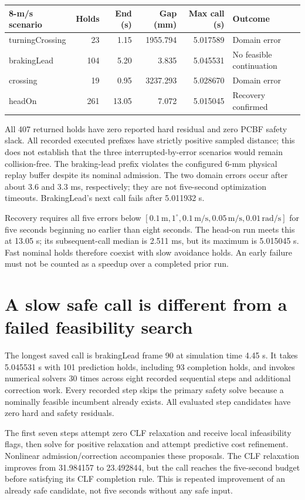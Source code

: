\documentclass[11pt]{article}
\begin{document}
\begin{center}\small
\begin{tabular}{lrrrrl}
\toprule
8-m/s scenario & Holds & End (s) & Gap (mm) & Max call (s) & Outcome \\
\midrule
turningCrossing & 23 & 1.15 & 1955.794 & 5.017589 & Domain error \\
brakingLead & 104 & 5.20 & 3.835 & 5.045531 & No feasible continuation \\
crossing & 19 & 0.95 & 3237.293 & 5.028670 & Domain error \\
headOn & 261 & 13.05 & 7.072 & 5.015045 & Recovery confirmed \\
\bottomrule
\end{tabular}\end{center}
All 407 returned holds have zero reported hard residual and zero PCBF safety
slack. All recorded executed prefixes have strictly positive sampled distance;
this does not establish that the three interrupted-by-error scenarios would
remain collision-free. The braking-lead prefix violates the configured 6-mm
physical replay buffer despite its nominal admission. The two domain errors
occur after about 3.6 and 3.3 ms, respectively; they are not five-second
optimization timeouts. BrakingLead's next call fails after 5.011932 s.

Recovery requires all five errors below
$[0.1\,\mathrm m,1^\circ,0.1\,\mathrm{m/s},0.05\,\mathrm{m/s},0.01\,\mathrm{rad/s}]$
for five seconds beginning no earlier than eight seconds. The head-on run
meets this at 13.05 s; its subsequent-call median is 2.511 ms, but its maximum
is 5.015045 s. Fast nominal holds therefore coexist with slow avoidance holds.
An early failure must not be counted as a speedup over a completed prior run.

\section{A slow safe call is different from a failed feasibility search}
The longest saved call is brakingLead frame 90 at simulation time 4.45 s.
It takes 5.045531 s with 101 prediction holds, including 93 completion holds,
and invokes numerical solvers 30 times across eight recorded sequential steps
and additional correction work. Every recorded step skips the primary safety
solve because a nominally feasible incumbent already exists. All evaluated
step candidates have zero hard and safety residuals.

The first seven steps attempt zero CLF relaxation and receive local
infeasibility flags, then solve for positive relaxation and attempt predictive
cost refinement. Nonlinear admission/correction accompanies these proposals.
The CLF relaxation improves from 31.984157 to 23.492844, but the call reaches
the five-second budget before satisfying its CLF completion rule. This is
repeated improvement of an already safe candidate, not five seconds without
any safe input.
\end{document}
